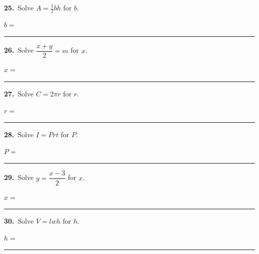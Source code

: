 \documentclass[11pt,letterpaper]{article}
\begin{document}
\needspace{3.5cm}\par\vspace{3mm}\noindent \begin{minipage}[t][3.0cm]{0.48\linewidth}\raggedright{\color{fmturn}\bfseries 25.}\ Solve $A = \tfrac12 bh$ for $b$.\par\vfill\hfill $b = $\ \rule{3.2cm}{0.4pt}\end{minipage}\hfill \begin{minipage}[t][3.0cm]{0.48\linewidth}\raggedright{\color{fmturn}\bfseries 26.}\ Solve $\dfrac{x + y}{2} = m$ for $x$.\par\vfill\hfill $x = $\ \rule{3.2cm}{0.4pt}\end{minipage}\par
\needspace{3.5cm}\par\vspace{3mm}\noindent \begin{minipage}[t][3.0cm]{0.48\linewidth}\raggedright{\color{fmturn}\bfseries 27.}\ Solve $C = 2\pi r$ for $r$.\par\vfill\hfill $r = $\ \rule{3.2cm}{0.4pt}\end{minipage}\hfill \begin{minipage}[t][3.0cm]{0.48\linewidth}\raggedright{\color{fmturn}\bfseries 28.}\ Solve $I = Prt$ for $P$.\par\vfill\hfill $P = $\ \rule{3.2cm}{0.4pt}\end{minipage}\par
\needspace{3.5cm}\par\vspace{3mm}\noindent \begin{minipage}[t][3.0cm]{0.48\linewidth}\raggedright{\color{fmturn}\bfseries 29.}\ Solve $y = \dfrac{x - 3}{2}$ for $x$.\par\vfill\hfill $x = $\ \rule{3.2cm}{0.4pt}\end{minipage}\hfill \begin{minipage}[t][3.0cm]{0.48\linewidth}\raggedright{\color{fmturn}\bfseries 30.}\ Solve $V = lwh$ for $h$.\par\vfill\hfill $h = $\ \rule{3.2cm}{0.4pt}\end{minipage}\par
\end{document}
